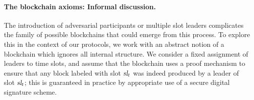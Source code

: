 \paragraph{The blockchain axioms: Informal discussion.}
The introduction of adversarial participants or multiple slot leaders
complicates the family of possible blockchains that could emerge from
this process. To explore this in the context of our protocols, we work
with an abstract notion of a blockchain which
ignores all internal structure. We consider a fixed assignment of
leaders to time slots, and assume that the blockchain uses a proof
mechanism to ensure that any block labeled with slot $\textsl{sl}_t$ was
indeed produced by a leader of slot $\textsl{sl}_t$; this is guaranteed in
practice by appropriate use of a secure digital signature scheme.

